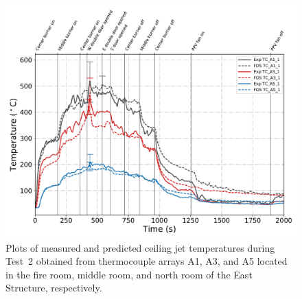 \begin{figure}[!h]
	\centering
	\includegraphics[width=\columnwidth]{Figures/Plots/Validation/Temperature/Test_2_cjet_1}
	\caption[Plots of measured and predicted ceiling jet temperatures during Test~2.]{Plots of measured and predicted ceiling jet temperatures during Test~2 obtained from thermocouple arrays A1, A3, and A5 located in the fire room, middle room, and north room of the East Structure, respectively.}
	\label{fig:cjet1_data_Test2}
\end{figure}

